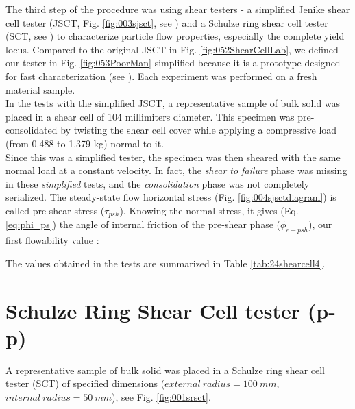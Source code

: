 The third step of the procedure was using shear testers - 
a simplified Jenike shear cell tester (\acs{JSCT}, Fig. \ref{fig:003sjsct}, see
\citet{RefWorks:114}) and a Schulze ring shear cell
tester (\acs{SCT}, see \citet{RefWorks:142}) to characterize particle flow
properties, especially the complete yield locus.
Compared to the original \acs{JSCT} in Fig. \ref{fig:052ShearCellLab}, we
defined our tester in Fig.
\ref{fig:053PoorMan} simplified because it is a prototype designed for fast characterization (see \citet{RefWorks:138}).
Each experiment was performed on a fresh material sample. \\
In the tests with the simplified \acs{JSCT}, a representative sample of bulk solid 
was placed in a shear cell of 104 millimiters diameter. 
This specimen was pre-consolidated by twisting the shear cell cover while applying a 
compressive load (from 0.488 to 1.379 kg) normal to it.\\
Since this was a simplified tester, the specimen was then sheared with the 
same normal load at a constant velocity. 
In fact, the \textit{shear to failure} phase was missing in these \textit{simplified} tests, 
and the \textit{consolidation} phase was not completely serialized.
The steady-state flow horizontal stress (Fig. \ref{fig:004sjsctdiagram}) is
called pre-shear stress ($\tau_{psh}$). 
Knowing the normal stress, it gives (Eq. \ref{eq:phi_ps}) the angle of internal 
friction of the pre-shear phase ($\phi_{e-psh}$), our first flowability value \cite{RefWorks:118}:


The values obtained in the tests are summarized in Table \ref{tab:24shearcell4}.



\section{Schulze Ring Shear Cell tester (p-p)}
\label{sec:SRSCT}







A representative sample of bulk solid was placed in a Schulze ring shear cell
tester (\acs{SCT}) of specified dimensions ($external ~ radius = 100 ~ mm$,
$internal ~ radius = 50 ~ mm$), see Fig. \ref{fig:001srsct}.

